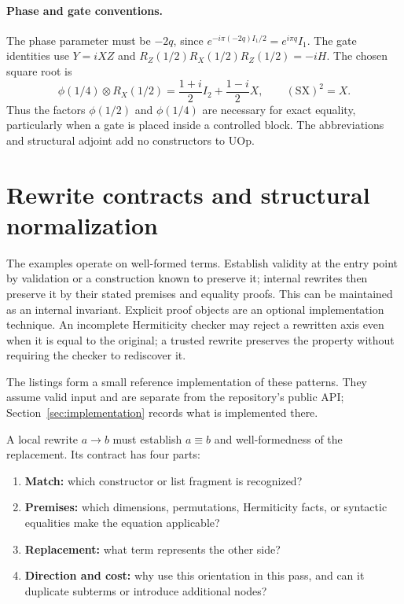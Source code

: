 \documentclass[11pt,a4paper]{article}
\newcommand{\Ph}[1]{\phi(#1)}
\begin{document}
\paragraph{Phase and gate conventions.}
The phase parameter must be $-2q$, since
$e^{-i\pi(-2q)I_1/2}=e^{i\pi q}I_1$.
The gate identities use $Y=iXZ$ and
$R_Z(1/2)R_X(1/2)R_Z(1/2)=-iH$.
The chosen square root is
\[
 \Ph{1/4}\otimes R_X(1/2)
 =\frac{1+i}{2}I_2+\frac{1-i}{2}X,
 \qquad (\mathrm{SX})^2=X.
\]
Thus the factors $\Ph{1/2}$ and $\Ph{1/4}$ are necessary for exact
equality, particularly when a gate is placed inside a controlled block.
The abbreviations and structural adjoint add no constructors to UOp.

\section{Rewrite contracts and structural normalization}

\label{sec:contracts}

The examples operate on well-formed terms. Establish validity at the
entry point by validation or a construction known to preserve it;
internal rewrites then preserve it by their stated premises and
equality proofs. This can be maintained as an internal invariant.
Explicit proof objects are an optional implementation technique.
An incomplete Hermiticity checker may reject a rewritten axis even when
it is equal to the original; a trusted rewrite preserves the property
without requiring the checker to rediscover it.

The listings form a small reference implementation of these patterns.
They assume valid input and are separate from the repository's public
API; Section~\ref{sec:implementation} records what is implemented there.

A local rewrite $a\longrightarrow b$ must establish $a\equiv b$ and
well-formedness of the replacement. Its contract has four parts:
\begin{enumerate}
\item \textbf{Match:} which constructor or list fragment is recognized?
\item \textbf{Premises:} which dimensions, permutations, Hermiticity
facts, or syntactic equalities make the equation applicable?
\item \textbf{Replacement:} what term represents the other side?
\item \textbf{Direction and cost:} why use this orientation in this pass,
and can it duplicate subterms or introduce additional nodes?
\end{enumerate}
\end{document}
